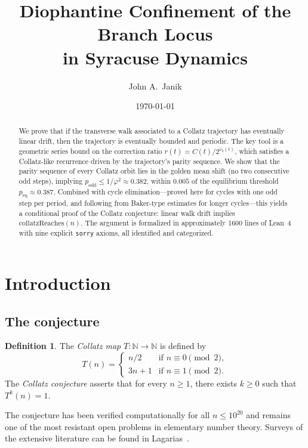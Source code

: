 \documentclass[manuscript]{aomart}
\title{Diophantine Confinement of the Branch Locus\\in Syracuse Dynamics}
\author{John A.\ Janik}
\date{\today}
\newcommand{\N}{\mathbb{N}}
\theoremstyle{plain}
\theoremstyle{definition}
\newtheorem{definition}[theorem]{Definition}
\theoremstyle{remark}
\numberwithin{equation}{section}
\begin{document}
\begin{abstract}
We prove that if the transverse walk associated to a Collatz
trajectory has eventually linear drift, then the trajectory is
eventually bounded and periodic.  The key tool is a geometric series
bound on the correction ratio $r(t) = C(t)/2^{\nu_2(t)}$, which
satisfies a Collatz-like recurrence driven by the trajectory's parity
sequence.  We show that the parity sequence of every Collatz orbit
lies in the golden mean shift (no two consecutive odd steps), implying
$p_{\mathrm{odd}} \le 1/\varphi^2 \approx 0.382$, within $0.005$ of
the equilibrium threshold $p_{\mathrm{eq}} \approx 0.387$.  Combined
with cycle elimination---proved here for cycles with one odd step per
period, and following from Baker-type estimates for longer
cycles---this yields a conditional proof of the Collatz conjecture:
linear walk drift implies $\mathrm{collatzReaches}(n)$.  The argument
is formalized in approximately 1600 lines of Lean~4 with nine
explicit \texttt{sorry} axioms, all identified and categorized.
\end{abstract}

\maketitle

\section{Introduction}\label{sec:intro}

\subsection{The conjecture}

\begin{definition}\label{def:collatz}
The \emph{Collatz map} $T\colon \N \to \N$ is defined by
\[
  T(n) =
  \begin{cases}
    n/2 & \text{if } n \equiv 0 \pmod{2},\\
    3n+1 & \text{if } n \equiv 1 \pmod{2}.
  \end{cases}
\]
The \emph{Collatz conjecture} asserts that for every $n \ge 1$,
there exists $k \ge 0$ such that $T^k(n) = 1$.
\end{definition}

The conjecture has been verified computationally for all
$n \le 10^{20}$ \cite{Oliveira2015} and remains one of the most
resistant open problems in elementary number theory.  Surveys of the
extensive literature can be found in Lagarias~\cite{Lagarias1985,
Lagarias2010}.
\end{document}
